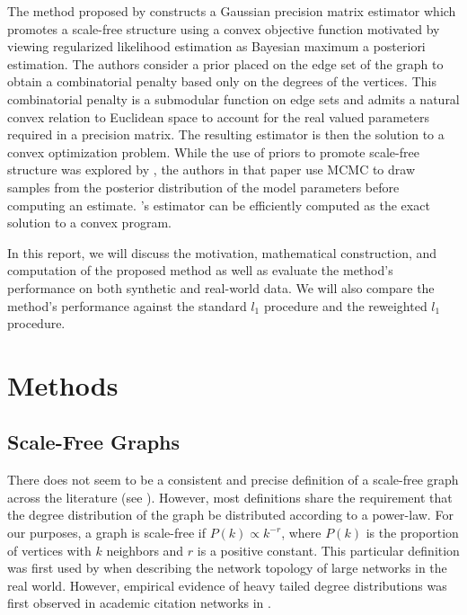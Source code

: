 \documentclass{uwstat572}
\theoremstyle{remark}
\theoremstyle{definition}
\begin{document}
The method proposed by \cite{Defazio2012} constructs a Gaussian precision matrix estimator which promotes a scale-free structure using a convex objective function motivated by viewing regularized likelihood estimation as Bayesian maximum a posteriori estimation.  
The authors consider a prior placed on the edge set of the graph to obtain a combinatorial penalty based only on the degrees of the vertices. This combinatorial penalty is a submodular function on edge sets and admits a natural convex relation to Euclidean space to account for the real valued parameters required in a precision matrix. The resulting estimator is then the solution to a convex optimization problem. While the use of priors to promote scale-free structure was explored by \cite{sheridan2010}, the authors in that paper use MCMC to draw samples from the posterior distribution of the model parameters before computing an estimate.  \citet{Defazio2012}'s estimator can be efficiently computed as the exact solution to a convex program.

In this report, we will discuss the motivation, mathematical construction, and computation of the proposed method as well as evaluate the method's performance on both synthetic and real-world data.  We will also compare the method's performance against the standard $l_1$ procedure and the reweighted $l_1$ procedure.  

\section{Methods}

\subsection{Scale-Free Graphs}

There does not seem to be a consistent and precise definition of a scale-free graph across the literature (see \citep{li2005}).  However, most definitions share the requirement that the degree distribution of the graph be distributed according to a power-law. For our purposes, a graph is scale-free if $P(k) \propto k^{-r}$, where $P(k)$ is the proportion of vertices with $k$ neighbors and $r$ is a positive constant.  This particular definition was first used by \cite{Barabasi99} when describing the network topology of large networks in the real world.  However, empirical evidence of heavy tailed degree distributions was first observed in academic citation networks in \citep{de1965networks}.
\end{document}
